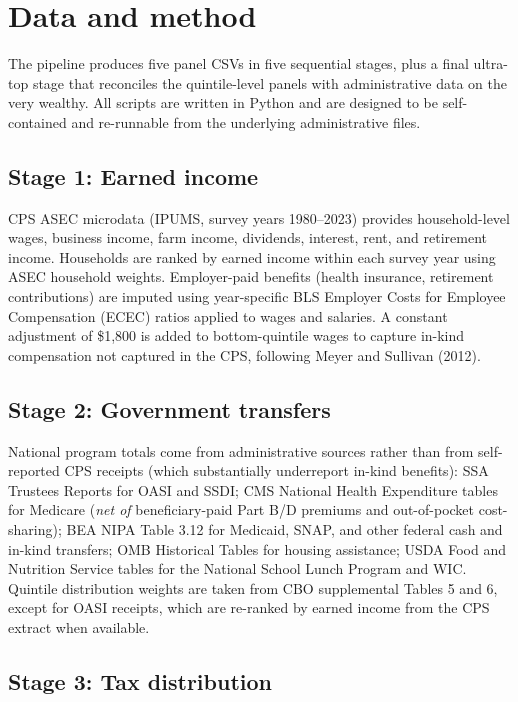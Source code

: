 \documentclass[11pt,letterpaper]{article}
\begin{document}
\section{Data and method}

The pipeline produces five panel CSVs in five sequential stages, plus a final
ultra-top stage that reconciles the quintile-level panels with administrative
data on the very wealthy. All scripts are written in Python and are designed
to be self-contained and re-runnable from the underlying administrative files.

\subsection{Stage 1: Earned income}

CPS ASEC microdata (IPUMS, survey years 1980--2023) provides household-level
wages, business income, farm income, dividends, interest, rent, and
retirement income. Households are ranked by earned income within each survey
year using ASEC household weights. Employer-paid benefits (health insurance,
retirement contributions) are imputed using year-specific BLS Employer Costs
for Employee Compensation (ECEC) ratios applied to wages and salaries. A
constant adjustment of \$1{,}800 is added to bottom-quintile wages to capture
in-kind compensation not captured in the CPS, following Meyer and Sullivan
(2012).

\subsection{Stage 2: Government transfers}

National program totals come from administrative sources rather than from
self-reported CPS receipts (which substantially underreport in-kind
benefits): SSA Trustees Reports for OASI and SSDI; CMS National Health
Expenditure tables for Medicare (\emph{net of} beneficiary-paid Part B/D
premiums and out-of-pocket cost-sharing); BEA NIPA Table 3.12 for Medicaid,
SNAP, and other federal cash and in-kind transfers; OMB Historical Tables for
housing assistance; USDA Food and Nutrition Service tables for the National
School Lunch Program and WIC. Quintile distribution weights are taken from
CBO supplemental Tables 5 and 6, except for OASI receipts, which are
re-ranked by earned income from the CPS extract when available.

\subsection{Stage 3: Tax distribution}
\end{document}
